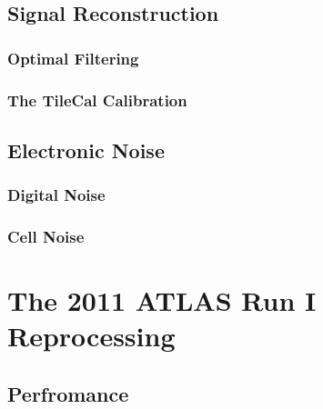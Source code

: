 \documentclass[10pt,twoside,cucitura,classica,english,openany]{toptesi}
\begin{document}


\subsection{Signal Reconstruction}
\label{sec:sign-reconstr}



\subsubsection{Optimal Filtering}
\label{sec:optimal-filtering}



\subsubsection{The TileCal Calibration}
\label{sec:tilecal-calibration}



\subsection{Electronic Noise}
\label{sec:electronic-noise}



\subsubsection{Digital Noise}
\label{sec:digital-noise}



\subsubsection{Cell Noise}
\label{sec:cell-noise}



\section{The 2011 ATLAS Run I Reprocessing}
\label{sec:2011-atlas-run}



\subsection{Perfromance}
\label{sec:perfromance}
\end{document}
